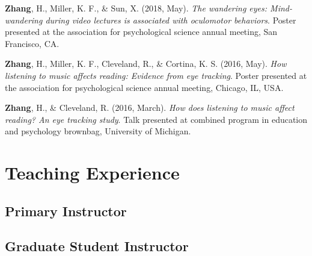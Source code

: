 \documentclass[11pt, a4paper]{awesome-cv}
\begin{document}
\leavevmode\hypertarget{ref-zhang_wandering_2018}{}%
\textbf{Zhang}, H., Miller, K. F., \& Sun, X. (2018, May). \emph{The
wandering eyes: Mind-wandering during video lectures is associated with
oculomotor behaviors}. Poster presented at the association for
psychological science annual meeting, San Francisco, CA.

\leavevmode\hypertarget{ref-zhang_how_2016}{}%
\textbf{Zhang}, H., Miller, K. F., Cleveland, R., \& Cortina, K. S.
(2016, May). \emph{How listening to music affects reading: Evidence from
eye tracking}. Poster presented at the association for psychological
science annual meeting, Chicago, IL, USA.

\leavevmode\hypertarget{ref-zhang_how_2016-1}{}%
\textbf{Zhang}, H., \& Cleveland, R. (2016, March). \emph{How does
listening to music affect reading? An eye tracking study}. Talk
presented at combined program in education and psychology brownbag,
University of Michigan.

\endgroup

\hypertarget{teaching-experience}{%
\section{Teaching Experience}\label{teaching-experience}}

\hypertarget{primary-instructor}{%
\subsection{Primary Instructor}\label{primary-instructor}}

\begin{cventries}
    \vspace{-4.0mm}
\end{cventries}

\hypertarget{graduate-student-instructor}{%
\subsection{Graduate Student
Instructor}\label{graduate-student-instructor}}
\end{document}
